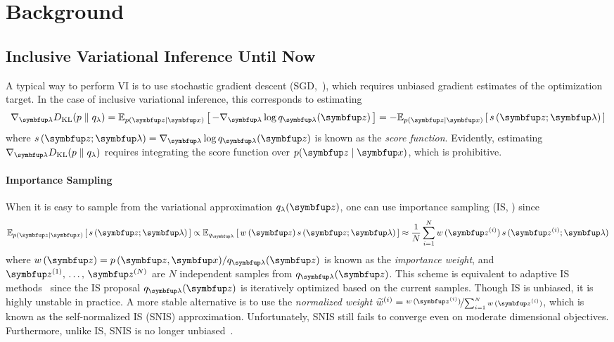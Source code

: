 
\section{Background}
\vspace{-0.05in}
\subsection{Inclusive Variational Inference Until Now}\label{section:ivi_previous}
\vspace{-0.05in}
A typical way to perform VI is to use stochastic gradient descent (SGD,~\citealt{robbins_stochastic_1951, bottou_online_1999}), which requires unbiased gradient estimates of the optimization target.
In the case of inclusive variational inference, this corresponds to estimating
%
\begin{align}
  \nabla_{\vlambda} \DKL{p}{q_{\lambda}}
  = \Esub{p(\vz\mid\vx)}{ - \nabla_{\vlambda} \log q_{\vlambda}(\vz) }
  = - \Esub{p(\vz\mid\vx)}{ s\,(\vz; \vlambda) }
\end{align}
where \(s\,(\vz; \vlambda) = \nabla_{\vlambda} \log q_{\vlambda}(\vz)\) is known as the \textit{score function}.
Evidently, estimating \(\nabla_{\vlambda} \DKL{p}{q_{\lambda}}\) requires integrating the score function over \(p(\vz\mid\vx)\), which is prohibitive.

\vspace{-0.1in}
\paragraph{Importance Sampling}
When it is easy to sample from the variational approximation \(q_{\lambda}(\vz)\), one can use importance sampling (IS, \citealt{robert_monte_2004, mcbook}) since 
\begin{align}
  \Esub{p(\vz\mid\vx)}{ s\,(\vz; \vlambda) }
  \propto \Esub{q_{\vlambda}}{ w\,(\vz) \, s\,(\vz; \vlambda) }
  \approx \frac{1}{N} \sum^{N}_{i=1} w\,(\vz^{(i)}) \, s\,(\vz^{(i)}; \vlambda)
\end{align}
where \(w\,(\vz) = p\,(\vz,\vx) / q_{\vlambda}(\vz)\) is known as the \textit{importance weight}, and \(\vz^{(1)},\, \ldots,\, \vz^{(N)}\) are \(N\) independent samples from \(q_{\vlambda}(\vz)\).
This scheme is equivalent to adaptive IS methods~\citep{cappe_adaptive_2008, bugallo_adaptive_2017} since the IS proposal \(q_{\vlambda}(\vz)\) is iteratively optimized based on the current samples.
Though IS is unbiased, it is highly unstable in practice.
A more stable alternative is to use the \textit{normalized weight} \(\widetilde{w}^{(i)} = \nicefrac{w\,(\vz^{(i)})}{\sum_{i=1}^N w\,(\vz^{(i)}) }\), which is known as the self-normalized IS (SNIS) approximation.
Unfortunately, SNIS still fails to converge even on moderate dimensional objectives.
Furthermore, unlike IS, SNIS is no longer unbiased~\citep{robert_monte_2004, mcbook}.

